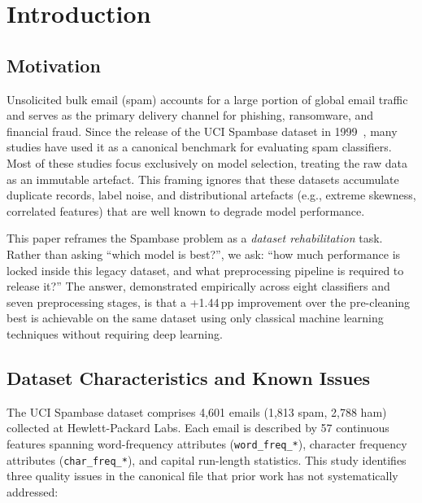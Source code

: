 \documentclass[conference]{IEEEtran}
\begin{document}
\section{Introduction}

\subsection{Motivation}

Unsolicited bulk email (spam) accounts for a large portion of global
email traffic and serves as the primary delivery
channel for phishing, ransomware, and financial fraud. Since
the release of the UCI Spambase dataset in 1999~\cite{ref1},
many studies have used it as a canonical benchmark for
evaluating spam classifiers. Most of these studies focus exclusively on model selection, treating the raw data as an immutable artefact. This framing ignores that these datasets accumulate duplicate records, label noise, and distributional artefacts
(e.g., extreme skewness, correlated features) that are well known to degrade model performance.

This paper reframes the Spambase problem as a \emph{dataset
rehabilitation} task. Rather than asking ``which model is
best?'', we ask: ``how much performance is locked inside this
legacy dataset, and what preprocessing pipeline is required to
release it?'' The answer, demonstrated empirically across eight
classifiers and seven preprocessing stages, is that a +1.44\,pp
improvement over the pre-cleaning best is achievable
on the same dataset using only classical machine learning
techniques without requiring deep learning.

\subsection{Dataset Characteristics and Known Issues}

The UCI Spambase dataset comprises 4,601 emails
(1,813 spam, 2,788 ham) collected at Hewlett-Packard Labs.
Each email is described by 57 continuous features spanning
word-frequency attributes (\texttt{word\_freq\_*}), character
frequency attributes (\texttt{char\_freq\_*}), and capital
run-length statistics.  This study identifies three quality
issues in the canonical file that prior work has not
systematically addressed:
\end{document}
